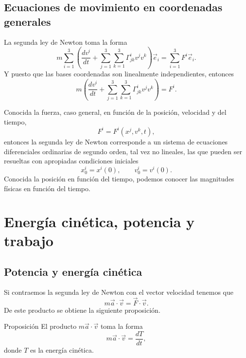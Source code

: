 \documentclass[../apunte_mecanica_clasica.tex]{subfiles}%
\begin{document}
\subsection{Ecuaciones de movimiento en coordenadas generales}

La segunda ley de Newton toma la forma
\begin{equation*}
    m\sum_{i=1}^{3}\left(\frac{dv^i}{dt}+\sum_{j=1}^{3}\sum_{k=1}^{3}\Gamma^{i}_{jk}v^jv^k\right)\vec e_i
    =\sum_{i=1}^{3}F^i\vec e_i.
\end{equation*}
Y puesto que las bases coordenadas son linealmente independientes, entonces
\begin{equation}
    m\left(\frac{dv^i}{dt}+\sum_{j=1}^{3}\sum_{k=1}^{3}\Gamma^{i}_{jk}v^jv^k\right)=F^i.
    \label{eq:mecanica-segunda-newton-curvilinea}
\end{equation}

Conocida la fuerza, caso general, en función de la posición, velocidad y del tiempo,
\begin{equation}
    F^i=F^i(x^j,v^k,t),
    \label{eq:mecanica-fuerza-general}
\end{equation}
entonces la segunda ley de Newton corresponde a un sistema de ecuaciones diferenciales ordinarias de segundo orden, tal vez no lineales, las que pueden ser resueltas con apropiadas condiciones iniciales
\begin{equation}
    x^i_0=x^i(0),
    \qquad
    v^i_0=v^i(0).
    \label{eq:mecanica-condiciones-iniciales}
\end{equation}
Conocida la posición en función del tiempo, podemos conocer las magnitudes físicas en función del tiempo.

\section{Energía cinética, potencia y trabajo}

\subsection{Potencia y energía cinética}

Si contraemos la segunda ley de Newton con el vector velocidad tenemos que
\begin{equation}
    m\vec a\cdot \vec v=\vec F\cdot\vec v.
    \label{eq:mecanica-contraccion-velocidad}
\end{equation}
De este producto se obtiene la siguiente proposición.

\begin{apuntebloque}{Proposición}
El producto $m\vec a\cdot\vec v$ toma la forma
\begin{equation}
    m\vec a\cdot\vec v=\frac{dT}{dt},
    \label{eq:mecanica-derivada-energia-cinetica}
\end{equation}
donde $T$ es la energía cinética.
\end{apuntebloque}
\end{document}
